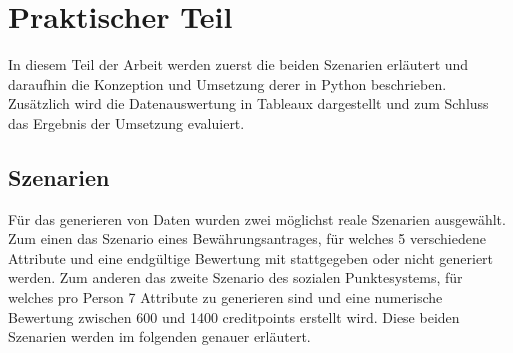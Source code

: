 \chapter{Praktischer Teil}
\label{sec:praktischerteil}
\begin{onehalfspace}
In diesem Teil der Arbeit werden zuerst die beiden Szenarien erläutert und daraufhin die Konzeption und Umsetzung derer in Python beschrieben. Zusätzlich wird die Datenauswertung in Tableaux dargestellt und zum Schluss das Ergebnis der Umsetzung evaluiert.
\section{Szenarien}
\label{subsec:szenarien}
Für das generieren von Daten wurden zwei möglichst reale Szenarien ausgewählt. Zum einen das Szenario eines Bewährungsantrages, für welches 5 verschiedene Attribute und eine endgültige Bewertung mit stattgegeben oder nicht generiert werden. Zum anderen das zweite Szenario des sozialen Punktesystems, für welches pro Person 7 Attribute zu generieren sind und eine numerische Bewertung zwischen 600 und 1400 creditpoints erstellt wird. Diese beiden Szenarien werden im folgenden genauer erläutert.

\end{onehalfspace}
